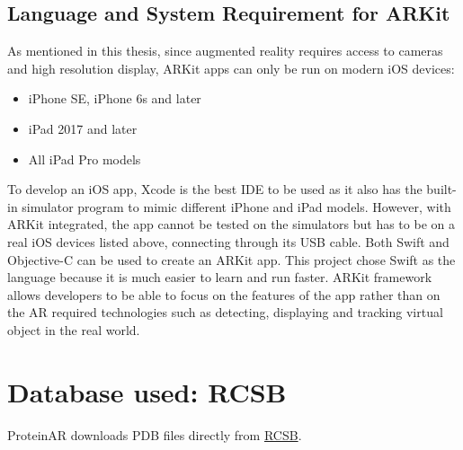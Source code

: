 \subsection{Language and System Requirement for ARKit}
As mentioned in this thesis, since augmented reality requires access to cameras and high resolution display, ARKit apps can only be run on modern iOS devices: 
\begin{itemize}
	\item iPhone SE, iPhone 6s and later
	\item iPad 2017 and later
	\item All iPad Pro models
\end{itemize}
To develop an iOS app, Xcode is the best IDE to be used as it also has the built-in simulator program to mimic different iPhone and iPad models. However, with ARKit integrated, the app cannot be tested on the simulators but has to be on a real iOS devices listed above, connecting through its USB cable.
Both Swift and Objective-C can be used to create an ARKit app. This project chose Swift as the language because it is much easier to learn and run faster. 
ARKit framework allows developers to be able to focus on the features of the app rather than on the AR required technologies such as detecting, displaying and tracking virtual object in the real world. 


\section{Database used: RCSB}
ProteinAR downloads PDB files directly from \href{https://www.rcsb.org/}{RCSB}. 

